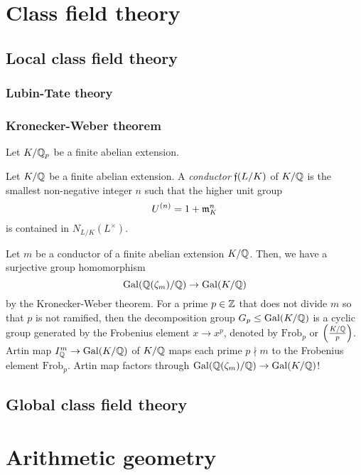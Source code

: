 \documentclass{../../large}
\newcommand{\Frob}{\mathrm{Frob}}
\begin{document}
\part{Class field theory}
\chapter{Local class field theory}
\section{Lubin-Tate theory}
\section{Kronecker-Weber theorem}
\begin{prb}
Let $K/\mathbb{Q}_p$ be a finite abelian extension.

\end{prb}





Let $K/\mathbb{Q}$ be a finite abelian extension.
A \emph{conductor} $\mathfrak{f}(L/K)$ of $K/\mathbb{Q}$ is the smallest non-negative integer $n$ such that the higher unit group
\[U^{(n)}=1+\mathfrak{m}_K^n\]
is contained in $N_{L/K}(L^\times)$.

Let $m$ be a conductor of a finite abelian extension $K/\mathbb{Q}$.
Then, we have a surjective group homomorphism
\[\operatorname{Gal}(\mathbb{Q}(\zeta_m)/\mathbb{Q})\to\operatorname{Gal}(K/\mathbb{Q})\]
by the Kronecker-Weber theorem.
For a prime $p\in\mathbb{Z}$ that does not divide $m$ so that $p$ is not ramified, then the decomposition group $G_p\le\operatorname{Gal}(K/\mathbb{Q})$ is a cyclic group generated by the Frobenius element $x\to x^p$, denoted by $\Frob_p$ or $\left(\frac{K/\mathbb{Q}}p\right)$.
Artin map $I_{\mathbb{Q}}^m\to\operatorname{Gal}(K/\mathbb{Q})$ of $K/\mathbb{Q}$ maps each prime $p\nmid m$ to the Frobenius element $\Frob_p$.
Artin map factors through $\operatorname{Gal}(\mathbb{Q}(\zeta_m)/\mathbb{Q})\to\operatorname{Gal}(K/\mathbb{Q})$!


\chapter{Global class field theory}



\chapter{}




\part{Arithmetic geometry}
\end{document}
